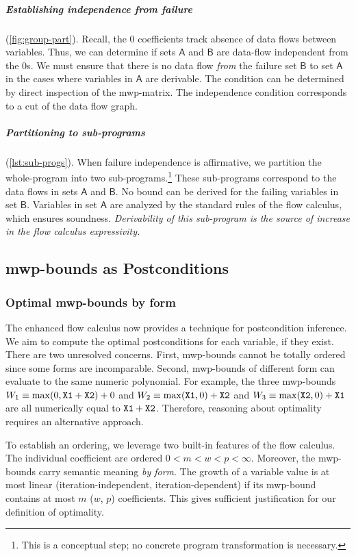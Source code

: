 \subparagraph*{Establishing independence from failure} (\autoref{fig:group-part}).
Recall, the \(0\) coefficients track {absence} of data flows between variables.
Thus, we can determine if sets \(\mathsf{A}\) and \(\mathsf{B}\) are data-flow independent from the \(0\)s.
We must ensure that there is no data flow \emph{from} the failure set \(\mathsf{B}\) to set \(\mathsf{A}\) in the cases where variables in \(\mathsf{A}\) are derivable.
The condition can be determined by direct inspection of the mwp-matrix.
The independence condition corresponds to a cut of the data flow graph.

\subparagraph*{Partitioning to sub-programs} (\autoref{lst:sub-progs}).
When failure independence is affirmative, we {partition} the whole-program into two sub-programs.\footnote{
    This is a conceptual step; no concrete program transformation is necessary.}
These sub-programs correspond to the data flows in sets \(\mathsf{A}\) and \(\mathsf{B}\).
No bound can be derived for the failing variables in set \(\mathsf{B}\).
Variables in set \(\mathsf{A}\) are analyzed by the standard rules of the flow calculus, which ensures soundness.
\emph{Derivability of this sub-program is the source of increase in the flow calculus expressivity.}

\subsection{mwp-bounds as Postconditions}
\label{sec:pc-analysis}

\subsubsection{Optimal mwp-bounds by form}
\label{subsec:categories}

The enhanced flow calculus now provides a technique for postcondition inference.
We aim to compute the optimal postconditions for each variable, if they exist.
There are two unresolved concerns.
First, mwp-bounds cannot be totally ordered since some forms are incomparable.
Second, mwp-bounds of different form can evaluate to the same numeric polynomial.
For example, the three mwp-bounds
\(W_1 \equiv \max(0,\prm{X1}+\prm{X2})+0\) and
\(W_2 \equiv \max(\prm{X1},0)+\prm{X2}\) and
\(W_3 \equiv \max(\prm{X2},0)+\prm{X1}\) are all numerically equal to \(\prm{X1}+\prm{X2}\).
Therefore, reasoning about optimality requires an alternative approach.

To establish an ordering, we leverage two built-in features of the flow calculus.
The individual coefficient are ordered \(0 < m < w < p < \infty\).
Moreover, the mwp-bounds carry semantic meaning \emph{by form}.
The growth of a variable value is at most {linear} (\resp iteration-independent, iteration-dependent)
if its mwp-bound contains at most \(m\) (\resp \(w\), \(p\)) coefficients.
This gives sufficient justification for our definition of optimality.

